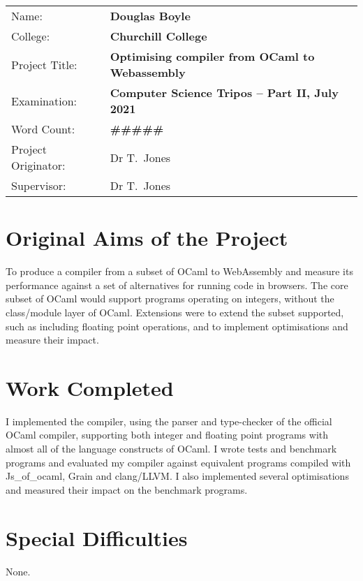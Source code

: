 \documentclass[a4paper,12pt,twoside]{report} %
\def\authorname{Douglas Boyle\xspace}
\def\authorcollege{Churchill College\xspace}
\def\dissertationtitle{Optimising compiler from OCaml to Webassembly}
\def\wordcount{\#\#\#\#\#}
\begin{document}
{\large
\begin{tabular}{ll}
Name:               & \bf\authorname     \\
College:            & \bf\authorcollege     \\
Project Title:      & \bf\dissertationtitle \\
Examination:        & \bf Computer Science Tripos -- Part II, July 2021  \\
Word Count:         & \bf \wordcount \footnotemark[1] \\
Project Originator: & Dr T.~Jones                    \\
Supervisor:         &  Dr T.~Jones                   \\ 
\end{tabular}
}

\section*{Original Aims of the Project}

To produce a compiler from a subset of OCaml to WebAssembly and measure its performance against a set of alternatives for running code in browsers. The core subset of OCaml would support programs operating on integers, without the class/module layer of OCaml. Extensions were to extend the subset supported, such as including floating point operations, and to implement optimisations and measure their impact.


\section*{Work Completed} %
I implemented the compiler, using the parser and type-checker of the official OCaml compiler, supporting both integer and floating point programs with almost all of the language constructs of OCaml. I wrote tests and benchmark programs and evaluated my compiler against equivalent programs compiled with Js\_of\_ocaml, Grain and clang/LLVM. I also implemented several optimisations and measured their impact on the benchmark programs.

\section*{Special Difficulties}
None.
 
\end{document}
